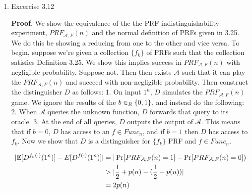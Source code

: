 \documentclass{article}
\begin{document}
\begin{enumerate}
\item{}
Excercise 3.12%

\begin{mdbmarginx}{1ex}{0pt}{1ex}{0pt}%
\noindent{}\textbf{Proof}.  We show the equivalence of the the PRF indistinguishability experiment, $PRF_{\mathcal{A},F}(n)$ and
the normal definition of PRFs given in 3.25. We do this be showing a reducing from one to the 
other and vice versa. To begin, suppose we're given a collection $\{f_k\}$ of PRFs such that the 
collection satisfies Definition 3.25. We show this implies success in $PRF_{\mathcal{A},F}(n)$ with
negligible probability.\mdbr
{}Suppose not. Then then exists $\mathcal{A}$ such that it can play the $PRF_{\mathcal{A},F}(n)$ and
succeed with non-negligible probability. Then construct the distinguisher $D$ as follows:
1. On input $1^n$, $D$ simulates the $PRF_{\mathcal{A},F}(n)$ game. We ignore the results 
of the $b \in_R \{0,1\}$, and instead do the following:
2. When $\mathcal{A}$ queries the unknown function, $D$ forwards that query to its oracle. 
3. At the end of all queries, $D$ outputs the output of $\mathcal{A}$. This means that if 
$b  = 0$, $D$ has access to an $f \in Func_n$, and if $b = 1$ then $D$ has access to $f_k$. 
Now we show that $D$ is a distinguisher for $\{f_k\}$ PRF and $f \in Func_n$.%
\end{mdbmarginx}%
\noindent\noindent\[%
\begin{aligned}
|\E[D^{f_k(\cdot)}(1^n)] - E[D^{f(\cdot)}(1^n)]| &= |\Pr[PRF_{\mathcal{A},F}(n) = 1] - \Pr[PRF_{\mathcal{A},F}(n) = 0]) \\
&> |\frac{1}{2} + p(n) - (\frac{1}{2} - p(n)) | \\
&= 2p(n)
\end{aligned}                                              
\]%


\end{enumerate}
\end{document}
